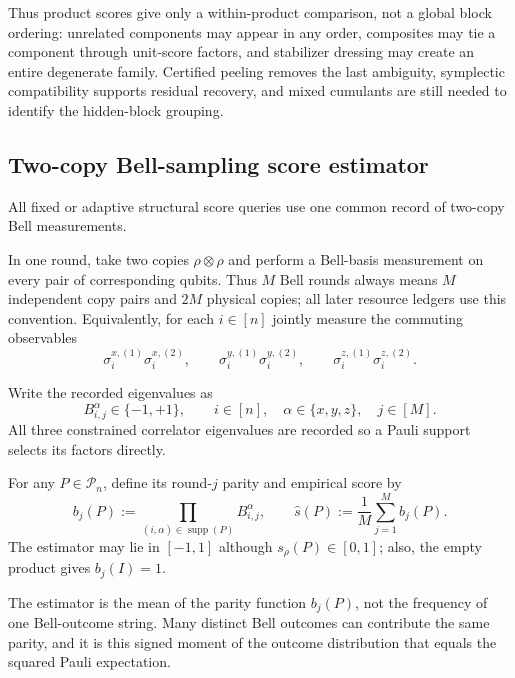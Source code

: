 \documentclass[
  aps,
  prx,
  reprint,
  superscriptaddress,
  amsmath,
  amssymb,
  nofootinbib,
  longbibliography
]{revtex4-2}
\newcommand{\supp}{\operatorname{supp}}
\newcommand{\Pc}{\mathcal{P}}
\begin{document}
Thus product scores give only a within-product comparison, not a global block
ordering: unrelated components may appear in any order, composites may tie a
component through unit-score factors, and stabilizer dressing may create an
entire degenerate family.  Certified peeling removes the last ambiguity,
symplectic compatibility supports residual recovery, and mixed cumulants are
still needed to identify the hidden-block grouping.

\subsection{Two-copy Bell-sampling score estimator}
\label{sec:supp-bell-estimator}

All fixed or adaptive structural score queries use one common record of
two-copy Bell measurements.

In one round, take two copies $\rho\otimes\rho$ and perform a Bell-basis
measurement on every pair of corresponding qubits.  Thus $M$ Bell rounds
always means $M$ independent copy pairs and $2M$ physical copies; all later
resource ledgers use this convention.  Equivalently, for each $i\in[n]$
jointly measure the commuting observables
\begin{equation}
\sigma_i^{x,(1)}\sigma_i^{x,(2)},
\qquad
\sigma_i^{y,(1)}\sigma_i^{y,(2)},
\qquad
\sigma_i^{z,(1)}\sigma_i^{z,(2)}.
\label{eq:supp-bell-observables}
\end{equation}

Write the recorded eigenvalues as
\begin{equation}
B_{i,j}^\alpha\in\{-1,+1\},
\qquad
i\in[n],\quad \alpha\in\{x,y,z\},\quad j\in[M].
\end{equation}
All three constrained correlator eigenvalues are recorded so a Pauli support
selects its factors directly.

For any $P\in\Pc_n$, define its round-$j$ parity and empirical score by
\begin{equation}
b_j(P)
:=
\prod_{(i,\alpha)\in\supp(P)}B_{i,j}^\alpha,
\qquad
\hat s(P)
:=
\frac1M\sum_{j=1}^M b_j(P).
\label{eq:supp-score-estimator}
\end{equation}
The estimator may lie in $[-1,1]$ although $s_\rho(P)\in[0,1]$; also,
the empty product gives $b_j(I)=1$.

The estimator is the mean of the parity function $b_j(P)$, not the
frequency of one Bell-outcome string.  Many distinct Bell outcomes can
contribute the same parity, and it is this signed moment of the outcome
distribution that equals the squared Pauli expectation.
\end{document}
